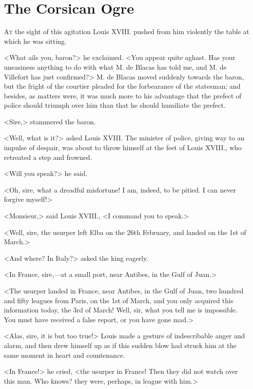 \chapter{The Corsican Ogre} 

 \lettrine{A}{t} the sight of this agitation Louis XVIII. pushed from him violently the table at which he was sitting. 

\zz
 <What ails you, baron?> he exclaimed. <You appear quite aghast. Has your uneasiness anything to do with what M. de Blacas has told me, and M. de Villefort has just confirmed?> M. de Blacas moved suddenly towards the baron, but the fright of the courtier pleaded for the forbearance of the statesman; and besides, as matters were, it was much more to his advantage that the prefect of police should triumph over him than that he should humiliate the prefect. 

 <Sire,\longdash> stammered the baron. 

 <Well, what is it?> asked Louis XVIII. The minister of police, giving way to an impulse of despair, was about to throw himself at the feet of Louis XVIII., who retreated a step and frowned. 

 <Will you speak?> he said. 

 <Oh, sire, what a dreadful misfortune! I am, indeed, to be pitied. I can never forgive myself!> 

 <Monsieur,> said Louis XVIII., <I command you to speak.> 

 <Well, sire, the usurper left Elba on the 26th February, and landed on the 1st of March.> 

 <And where? In Italy?> asked the king eagerly. 

 <In France, sire,—at a small port, near Antibes, in the Gulf of Juan.> 

 <The usurper landed in France, near Antibes, in the Gulf of Juan, two hundred and fifty leagues from Paris, on the 1st of March, and you only acquired this information today, the 3rd of March! Well, sir, what you tell me is impossible. You must have received a false report, or you have gone mad.> 

 <Alas, sire, it is but too true!> Louis made a gesture of indescribable anger and alarm, and then drew himself up as if this sudden blow had struck him at the same moment in heart and countenance. 

 <In France!> he cried, <the usurper in France! Then they did not watch over this man. Who knows? they were, perhaps, in league with him.> 

